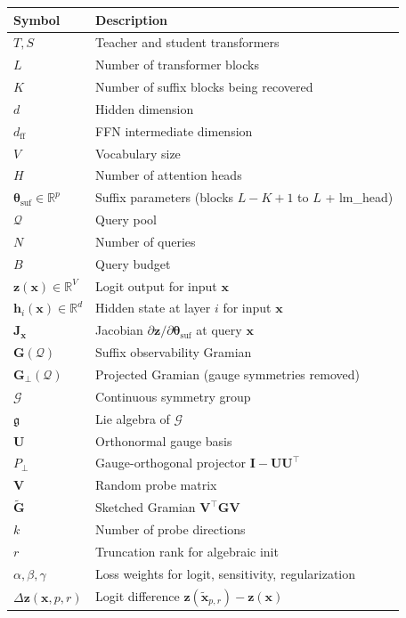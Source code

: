 \documentclass{article}
\newcommand{\R}{\mathbb{R}}
\newcommand{\cQ}{\mathcal{Q}}
\newcommand{\cG}{\mathcal{G}}
\newcommand{\btheta}{\boldsymbol{\theta}}
\newcommand{\bz}{\mathbf{z}}
\newcommand{\bh}{\mathbf{h}}
\newcommand{\bx}{\mathbf{x}}
\newcommand{\bJ}{\mathbf{J}}
\newcommand{\bG}{\mathbf{G}}
\newcommand{\bV}{\mathbf{V}}
\newcommand{\bU}{\mathbf{U}}
\newcommand{\bI}{\mathbf{I}}
\begin{document}
\begin{table}[h]
\centering
\small
\begin{tabular}{@{}ll@{}}
\toprule
\textbf{Symbol} & \textbf{Description} \\
\midrule
$T, S$ & Teacher and student transformers \\
$L$ & Number of transformer blocks \\
$K$ & Number of suffix blocks being recovered \\
$d$ & Hidden dimension \\
$d_\text{ff}$ & FFN intermediate dimension \\
$V$ & Vocabulary size \\
$H$ & Number of attention heads \\
$\btheta_{\text{suf}} \in \R^p$ & Suffix parameters (blocks $L{-}K{+}1$ to $L$ + lm\_head) \\
$\cQ$ & Query pool \\
$N$ & Number of queries \\
$B$ & Query budget \\
$\bz(\bx) \in \R^V$ & Logit output for input $\bx$ \\
$\bh_i(\bx) \in \R^d$ & Hidden state at layer $i$ for input $\bx$ \\
$\bJ_{\bx}$ & Jacobian $\partial\bz/\partial\btheta_\text{suf}$ at query $\bx$ \\
$\bG(\cQ)$ & Suffix observability Gramian \\
$\bG_\perp(\cQ)$ & Projected Gramian (gauge symmetries removed) \\
$\cG$ & Continuous symmetry group \\
$\mathfrak{g}$ & Lie algebra of $\cG$ \\
$\bU$ & Orthonormal gauge basis \\
$P_\perp$ & Gauge-orthogonal projector $\bI - \bU\bU^\top$ \\
$\bV$ & Random probe matrix \\
$\tilde{\bG}$ & Sketched Gramian $\bV^\top \bG \bV$ \\
$k$ & Number of probe directions \\
$r$ & Truncation rank for algebraic init \\
$\alpha, \beta, \gamma$ & Loss weights for logit, sensitivity, regularization \\
$\Delta\bz(\bx, p, r)$ & Logit difference $\bz(\tilde{\bx}_{p,r}) - \bz(\bx)$ \\
\bottomrule
\end{tabular}
\end{table}
\end{document}

